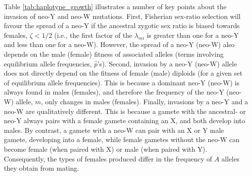 \documentclass[12pt]{article}
\begin{document}
Table \ref{tab:haplotype_growth} illustrates a number of key points about the invasion of neo-Y and neo-W mutations. 
First, Fisherian sex-ratio selection will favour the spread of a neo-Y if the ancestral zygotic sex ratio is biased towards females, $\zeta<1/2$ (i.e., the first factor of the $\lambda_{mi}$ is greater than one for a neo-Y and less than one for a neo-W).
However, the spread of a neo-Y (neo-W) also depends on the male (female) fitness of associated alleles (terms involving equilibrium allele frequencies, $\hat{p}$'s). %
Second, invasion by a neo-Y (neo-W) allele does not directly depend on the fitness of female (male) diploids (for a given set of equilibrium allele frequencies).
This is because a dominant neo-Y (neo-W) is always found in males (females), and therefore the frequency of the neo-Y (neo-W) allele, $m$, only changes in males (females). 
Finally, invasions by a neo-Y and a neo-W are qualitatively different.
This is because a gamete with the ancestral- or neo-Y always pairs with a female gamete containing an X, and both develop into males.
By contrast, a gamete with a neo-W can pair with an X or Y male gamete, developing into a female, while female gametes without the neo-W can become female (when paired with X) or male (when paired with Y).
Consequently, the types of females produced differ in the frequency of $A$ alleles they obtain from mating.
\end{document}
